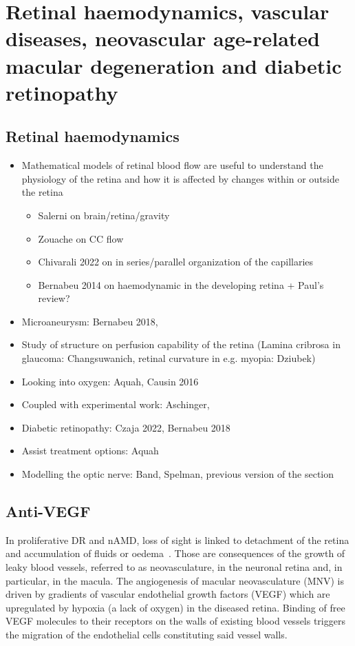 \documentclass[12pt,a4paper]{journal}
\begin{document}
\section{Retinal haemodynamics, vascular diseases, neovascular age-related macular degeneration and diabetic retinopathy}

\subsection{Retinal haemodynamics}

\begin{itemize}
\item Mathematical models of retinal blood flow are useful to understand the physiology of the retina and how it is affected by changes within or outside the retina
  \begin{itemize}
  \item Salerni on brain/retina/gravity
  \item Zouache on CC flow
  \item Chivarali 2022 on in series/parallel organization of the capillaries
  \item Bernabeu 2014 on haemodynamic in the developing retina + Paul's review?
  \end{itemize}
\item Microaneurysm: Bernabeu 2018,  
\item Study of structure on perfusion capability of the retina (Lamina cribrosa in glaucoma: Changsuwanich, retinal curvature in e.g. myopia: Dziubek)
\item Looking into oxygen: Aquah, Causin 2016
\item Coupled with experimental work: Aschinger,
\item Diabetic retinopathy: Czaja 2022, Bernabeu 2018
\item Assist treatment options: Aquah
\item Modelling the optic nerve: Band, Spelman, previous version of the section
\end{itemize}
\newpage

\subsection{Anti-VEGF}

In proliferative DR and nAMD, loss of sight is linked to detachment of the retina and accumulation of fluids or oedema~\cite{Roberts_2020, Waldstein_2016}.
Those are consequences of the growth of leaky blood vessels, referred to as neovasculature, in the neuronal retina and, in particular, in the macula.
The angiogenesis of macular neovasculature (MNV) is driven by gradients of vascular endothelial growth factors (VEGF) which are upregulated by hypoxia (a lack of oxygen) in the diseased retina.
Binding of free VEGF molecules to their receptors on the walls of existing blood vessels triggers the migration of the endothelial cells constituting said vessel walls.
\end{document}
